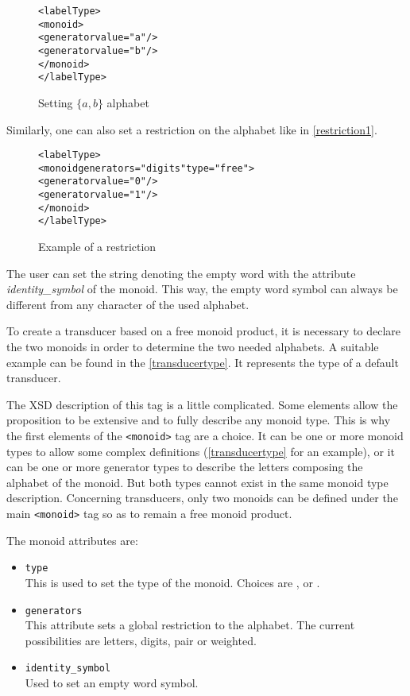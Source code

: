 \documentclass[a4paper]{article}
\newcommand{\xtag}[1]{\texttt{<#1>}}
\newcommand{\xattr}[1]{\texttt{#1}}
\def\monoidtag{\xtag{monoid}}
\begin{document}
\begin{figure}[ht]
  \small
  \begin{center}
\begin{alltt}
<labelType>
  <monoid>
     <generator value="a"/>
     <generator value="b"/>
  </monoid>
</labelType>
\end{alltt}

\caption{Setting $\{a, b\}$ alphabet}
\label{alpha1}
  \end{center}
\end{figure}

Similarly, one can also set a restriction on the alphabet like in
\autoref{restriction1}.

\begin{figure}[ht]
  \small
  \begin{center}
\begin{alltt}
<labelType>
  <monoid generators="digits" type="free">
    <generator value="0"/>
    <generator value="1"/>
  </monoid>
</labelType>
\end{alltt}

\caption{Example of a restriction}
\label{restriction1}
  \end{center}
\end{figure}


The user can set the string denoting the empty word with the attribute
\textit{identity\_symbol} of the monoid. This way, the empty word
symbol can always be different from any character of the used
alphabet.

To create a transducer based on a free monoid product, it is necessary
to declare the two monoids in order to determine the two needed
alphabets. A suitable example can be found in the
\autoref{transducertype}. It represents the type of a default
transducer.

The XSD description of this tag is a little complicated. Some elements
allow the proposition to be extensive and to fully describe any monoid
type. This is why the first elements of the \monoidtag{} tag are a
choice. It can be one or more monoid types to allow some complex
definitions (\autoref{transducertype} for an example), or it can
be one or more generator types to describe the letters composing the
alphabet of the monoid. But both types cannot exist in the same monoid
type description. Concerning transducers, only two monoids can be
defined under the main \monoidtag{} tag so as to remain a free monoid
product.

The monoid attributes are:
\begin{itemize}
\item \xattr{type}\\
  This is used to set the type of the monoid. Choices are ,
   or .
\item \xattr{generators}\\
  This attribute sets a global restriction to the alphabet. The
  current possibilities are letters, digits, pair or weighted.
\item \xattr{identity\_symbol}\\
  Used to set an empty word symbol.
\end{itemize}
\newpage
\end{document}
